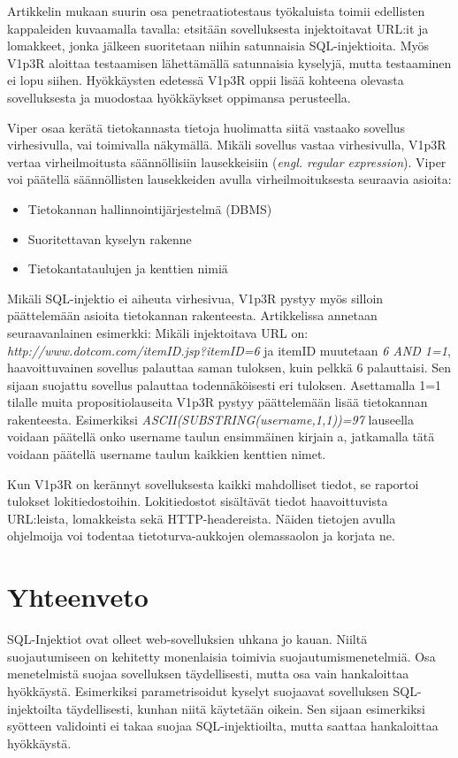 \documentclass[finnish]{tktltiki2}
\theoremstyle{definition}
\theoremstyle{remark}
\begin{document}
	Artikkelin mukaan suurin osa penetraatiotestaus työkaluista toimii edellisten kappaleiden kuvaamalla tavalla: etsitään sovelluksesta injektoitavat URL:it ja lomakkeet, jonka jälkeen suoritetaan niihin satunnaisia SQL-injektioita. Myös V1p3R aloittaa testaamisen lähettämällä satunnaisia kyselyjä, mutta testaaminen ei lopu siihen. Hyökkäysten edetessä V1p3R oppii lisää kohteena olevasta sovelluksesta ja muodostaa hyökkäykset oppimansa perusteella.
	
	 Viper osaa kerätä tietokannasta tietoja huolimatta siitä vastaako sovellus virhesivulla, vai toimivalla näkymällä. Mikäli sovellus vastaa virhesivulla, V1p3R vertaa virheilmoitusta säännöllisiin lausekkeisiin (\textit{engl. regular expression}). Viper voi päätellä säännöllisten lausekkeiden avulla virheilmoituksesta seuraavia asioita:
	 \begin{itemize}
	 	\item Tietokannan hallinnointijärjestelmä (DBMS)
	    \item Suoritettavan kyselyn rakenne
		\item Tietokantataulujen ja kenttien nimiä
	\end{itemize}
	
	Mikäli SQL-injektio ei aiheuta virhesivua, V1p3R pystyy myös silloin päättelemään asioita tietokannan rakenteesta. Artikkelissa annetaan seuraavanlainen esimerkki: Mikäli injektoitava URL on: \textit{http://www.dotcom.com/itemID.jsp?itemID=6} ja itemID muutetaan \textit{6 AND 1=1}, haavoittuvainen sovellus palauttaa saman tuloksen, kuin pelkkä 6 palauttaisi. Sen sijaan suojattu sovellus palauttaa todennäköisesti eri tuloksen. Asettamalla 1=1 tilalle muita propositiolauseita V1p3R pystyy päättelemään lisää tietokannan rakenteesta. Esimerkiksi \textit{ASCII(SUBSTRING(username,1,1))=97 } lauseella voidaan päätellä onko username taulun ensimmäinen kirjain a, jatkamalla tätä voidaan päätellä username taulun kaikkien kenttien nimet.
	
	Kun V1p3R on kerännyt sovelluksesta kaikki mahdolliset tiedot, se raportoi tulokset lokitiedostoihin. Lokitiedostot sisältävät tiedot haavoittuvista URL:leista, lomakkeista sekä HTTP-headereista. Näiden tietojen avulla ohjelmoija voi todentaa tietoturva-aukkojen olemassaolon ja korjata ne.
	
	
	\section {Yhteenveto}
	SQL-Injektiot ovat olleet web-sovelluksien uhkana jo kauan. Niiltä suojautumiseen on kehitetty monenlaisia toimivia suojautumismenetelmiä. Osa menetelmistä suojaa sovelluksen täydellisesti, mutta osa vain hankaloittaa hyökkäystä. Esimerkiksi parametrisoidut kyselyt suojaavat sovelluksen SQL-injektoilta täydellisesti, kunhan niitä käytetään oikein. Sen sijaan esimerkiksi syötteen validointi ei takaa suojaa SQL-injektioilta, mutta saattaa hankaloittaa hyökkäystä.
	
\end{document}
